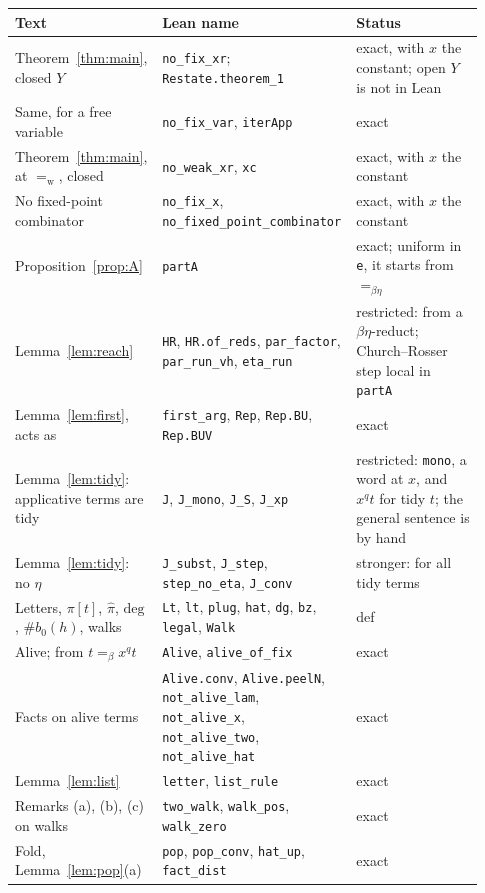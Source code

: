 \documentclass[a4paper,english]{lipics-v2021}
\newcommand{\eqw}{=_{\mathrm{w}}}
\newcommand{\eqb}{=_{\beta}}
\newcommand{\eqbe}{=_{\beta\eta}}
\newcommand{\hatw}[1]{\widehat{#1}}
\newcommand{\dg}{\mathrm{deg}}
\newcommand{\nb}[1]{\#b_0(#1)}
\newcommand{\lean}[1]{\texttt{#1}}
\begin{document}
{\footnotesize
\begin{longtable}{@{}p{0.29\linewidth}p{0.37\linewidth}p{0.27\linewidth}@{}}
\toprule
Text & Lean name & Status\\
\midrule
\endhead
Theorem~\ref{thm:main}, closed $Y$ & \lean{no\_fix\_xr}; \lean{Restate.theorem\_1} & exact, with $x$ the constant; open $Y$ is not in Lean\\
Same, for a free variable & \lean{no\_fix\_var}, \lean{iterApp} & exact\\
Theorem~\ref{thm:main}, at $\eqw$, closed & \lean{no\_weak\_xr}, \lean{xc} & exact, with $x$ the constant\\
No fixed-point combinator & \lean{no\_fix\_x}, \lean{no\_fixed\_point\_combinator} & exact, with $x$ the constant\\
Proposition~\ref{prop:A} & \lean{partA} & exact; uniform in \lean{e}, it starts from $\eqbe$\\
Lemma~\ref{lem:reach} & \lean{HR}, \lean{HR.of\_reds}, \lean{par\_factor}, \lean{par\_run\_vh}, \lean{eta\_run} & restricted: from a $\beta\eta$-reduct; Church--Rosser step local in \lean{partA}\\
Lemma~\ref{lem:first}, acts as & \lean{first\_arg}, \lean{Rep}, \lean{Rep.BU}, \lean{Rep.BUV} & exact\\
Lemma~\ref{lem:tidy}: applicative terms are tidy & \lean{J}, \lean{J\_mono}, \lean{J\_S}, \lean{J\_xp} & restricted: \lean{mono}, a word at $x$, and $x^q t$ for tidy $t$; the general sentence is by hand\\
Lemma~\ref{lem:tidy}: no $\eta$ & \lean{J\_subst}, \lean{J\_step}, \lean{step\_no\_eta}, \lean{J\_conv} & stronger: for all tidy terms\\
Letters, $\pi[t]$, $\hatw{\pi}$, $\dg$, $\nb{h}$, walks & \lean{Lt}, \lean{lt}, \lean{plug}, \lean{hat}, \lean{dg}, \lean{bz}, \lean{legal}, \lean{Walk} & def\\
Alive; from $t \eqb x^qt$ & \lean{Alive}, \lean{alive\_of\_fix} & exact\\
Facts on alive terms & \lean{Alive.conv}, \lean{Alive.peelN}, \lean{not\_alive\_lam}, \lean{not\_alive\_x}, \lean{not\_alive\_two}, \lean{not\_alive\_hat} & exact\\
Lemma~\ref{lem:list} & \lean{letter}, \lean{list\_rule} & exact\\
Remarks (a), (b), (c) on walks & \lean{two\_walk}, \lean{walk\_pos}, \lean{walk\_zero} & exact\\
Fold, Lemma~\ref{lem:pop}(a) & \lean{pop}, \lean{pop\_conv}, \lean{hat\_up}, \lean{fact\_dist} & exact\\

\end{longtable}}
\end{document}
